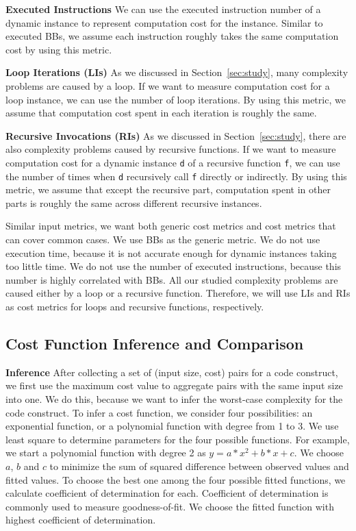 \noindent\textbf{Executed Instructions}
We can use the executed instruction number of a dynamic 
instance to represent computation cost for the instance. 
Similar to executed BBs, we assume each instruction 
roughly takes the same computation cost by using this metric. 


\noindent\textbf{{Loop Iterations (LIs)}}
As we discussed in Section~\ref{sec:study},
many complexity problems are caused by a loop.
If we want to measure computation cost for a loop instance,
we can use the number of loop iterations.
By using this metric, we assume that computation 
cost spent in each iteration is roughly the same. 

\noindent\textbf{Recursive Invocations (RIs)}
As we discussed in Section~\ref{sec:study},
there are also complexity problems caused by recursive functions.
If we want to measure computation cost for a dynamic instance \texttt{d}
of a recursive function \texttt{f}, 
we can use the number of times when
\texttt{d} recursively call \texttt{f} directly or indirectly. 
By using this metric, 
we assume that except the recursive part, 
computation spent in other parts is roughly 
the same across different recursive instances. 

Similar input metrics,
we want both generic cost metrics and cost metrics that can cover common cases. 
We use BBs as the generic metric.
We do not use execution time, 
because it is not accurate enough for dynamic instances taking too little time.
We do not use the number of executed instructions, 
because this number is highly correlated with BBs.  
All our studied complexity problems are caused either by a loop or a recursive function. 
Therefore, we will use LIs and RIs as cost metrics for loops and recursive functions, 
respectively. %


\subsection{Cost Function Inference and Comparison}

\noindent\textbf{Inference}
After collecting a set of (input size, cost) pairs for a code construct,
we first use the maximum cost value to aggregate pairs with the same input size into one.
We do this, because we want to infer the worst-case complexity for the code construct. 
To infer a cost function,
we consider four possibilities: 
an exponential function, or a polynomial function with degree from 1 to 3.
We use least square\cite{least} to determine parameters for the four possible functions. 
For example, we start a polynomial function with degree 2 as $y=a*x^2 + b*x +c$.
We choose $a$, $b$ and $c$ to minimize the sum of squared difference between 
observed values and fitted values.  
To choose the best one among the four possible fitted functions, 
we calculate coefficient of determination for each. 
Coefficient of determination is commonly used to measure goodness-of-fit\cite{codeter}.
We choose the fitted function with highest coefficient of determination. 


